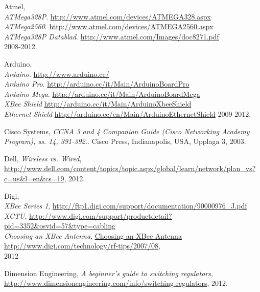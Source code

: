 \documentclass[a4paper,11pt]{article}
\begin{document}
\clearpage
{}
{}

\begin{thebibliography}{9}

\label{atmel}
   Atmel, \\
   \emph{ATMega328P}.
   \url{http://www.atmel.com/devices/ATMEGA328.aspx}\\
   \emph{ATMega2560}.
   \url{http://www.atmel.com/devices/ATMEGA2560.aspx}\\
   \emph{ATMega328P Datablad}.
   \url{http://www.atmel.com/Images/doc8271.pdf}\\
   2008-2012.

\label{arduino}
   Arduino,\\
   \emph{Arduino}.
   \url{http://www.arduino.cc/}\\
   \emph{Arduino Pro}.
   \url{http://arduino.cc/it/Main/ArduinoBoardPro}\\
   \emph{Arduino Mega}.
   \url{http://arduino.cc/it/Main/ArduinoBoardMega}\\
   \emph{XBee Shield}
   \url{http://arduino.cc/it/Main/ArduinoXbeeShield}\\
   \emph{Ethernet Shield}
   \url{http://arduino.cc/en/Main/ArduinoEthernetShield}
   2009-2012.

\label{cisco}
    Cisco Systems,
    \emph{CCNA 3 and 4 Companion Guide (Cisco Networking Academy Program), ss. 14, 391-392.}.
    Cisco Press, Indianapolis, USA,
    Upplaga 3,
    2003.

\label{dell}
    Dell,
    \emph{Wireless vs. Wired},
    \url{http://www.dell.com/content/topics/topic.aspx/global/learn/network/plan_vs?c=us&l=en&cs=19},
    2012.

\label{digi}
    Digi,\\
\emph{XBee Series 1},
\url{http://ftp1.digi.com/support/documentation/90000976_J.pdf}\\
\emph{XCTU},
\url{http://www.digi.com/support/productdetail?pid=3352&osvid=57&type=cabling}\\
\emph{Choosing an XBee Antenna},
\url{Choosing an XBee Antenna http://www.digi.com/technology/rf-tips/2007/08},\\
    2012

\label{dimension}
    Dimension Engineering,
    \emph{A beginner’s guide to switching regulators},
    \url{http://www.dimensionengineering.com/info/switching-regulators},
    2012.


\end{thebibliography}
\end{document}
